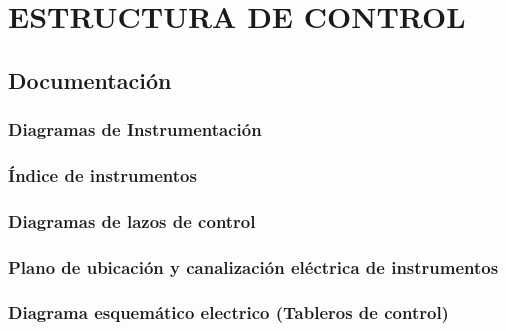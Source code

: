 \chapter{ESTRUCTURA DE CONTROL}
\thispagestyle{empty}

\section{Documentación}
\subsection{Diagramas de Instrumentación}
\subsection{Índice de instrumentos}
\subsection{Diagramas de lazos de control}
\subsection{Plano de ubicación y canalización eléctrica de instrumentos}
\subsection{Diagrama esquemático electrico (Tableros de control) }